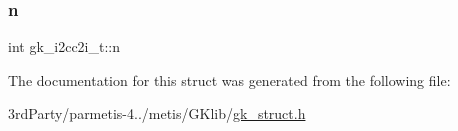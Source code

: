 \subsubsection{\texorpdfstring{n}{n}}
{\footnotesize\ttfamily int gk\+\_\+i2cc2i\+\_\+t\+::n}



The documentation for this struct was generated from the following file\+:\begin{DoxyCompactItemize}
\item 
3rd\+Party/parmetis-\/4../metis/\+G\+Klib/\hyperlink{gk__struct_8h}{gk\+\_\+struct.\+h}\end{DoxyCompactItemize}
